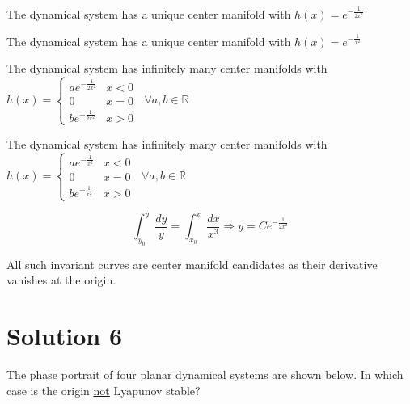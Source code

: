 \documentclass[twoside,10pt,a4paper]{article}
\begin{document}
\begin{enumerate}[label=(\alph*)]
	\item The dynamical system has a unique center manifold with $ \displaystyle h(x) = e^{-\frac{1}{2x^2}} $
	\item The dynamical system has a unique center manifold with $ \displaystyle h(x) = e^{-\frac{1}{x^2}} $
	{\color{MyRed}\item The dynamical system has infinitely many center manifolds with $ \displaystyle h(x) = \begin{cases}
		ae^{-\frac{1}{2x^2}} & x < 0 \\
		0 & x = 0 \\
		be^{-\frac{1}{2x^2}} & x > 0
	\end{cases} \;\; \forall a,b \in \mathbb{R}$}
	\item The dynamical system has infinitely many center manifolds with $ \displaystyle h(x) = \begin{cases}
		ae^{-\frac{1}{x^2}} & x < 0 \\
		0 & x = 0 \\
		be^{-\frac{1}{x^2}} & x > 0
	\end{cases} \;\;  \forall a,b \in \mathbb{R}$
\end{enumerate}

{\color{MyRed}
\begin{equation*}
	\int_{y_0}^y \frac{dy}{y} = \int_{x_0}^x \frac{dx}{x^3} \Longrightarrow y = Ce^{-\frac{1}{2x^2}}
\end{equation*}

All such invariant curves are center manifold candidates as their derivative vanishes at the origin.
}

\section*{Solution 6}
The phase portrait of four planar dynamical systems are shown below. In which case is the origin \underline{not} Lyapunov stable?
\end{document}

